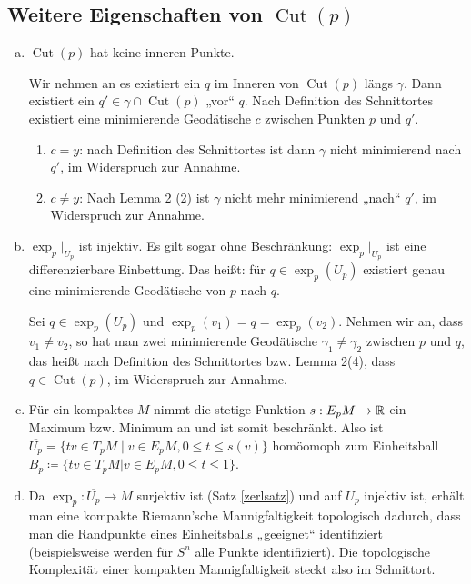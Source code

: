 \documentclass[a4paper,twoside,DIV15,BCOR12mm]{scrbook}
\renewcommand{\da}{\coloneqq}
\DeclareMathOperator{\cut}{Cut}
\begin{document}
\subsection*{Weitere Eigenschaften von $\cut(p)$}
\begin{enumerate}[(a)]
\item $\cut(p)$ hat keine inneren Punkte.
\begin{beweis}
Wir nehmen an es existiert ein $q$ im Inneren von $\cut(p)$ längs $\gamma$. Dann existiert ein $q' \in \gamma \cap \cut(p)$ „vor“ $q$. Nach Definition des Schnittortes existiert eine minimierende Geodätische $c$ zwischen Punkten $p$ und $q'$.
\begin{enumerate}[1. {Fall:}]
\item $c=y$: nach Definition des Schnittortes ist dann $\gamma$ nicht minimierend nach $q'$, im Widerspruch zur Annahme.
\item $c\ne y$: Nach Lemma 2 (2) ist $\gamma$ nicht mehr minimierend „nach“ $q'$, im Widerspruch zur Annahme.
\end{enumerate}
\end{beweis}
\item $\exp_p|_{U_p}$ ist injektiv. Es gilt sogar ohne Beschränkung: $\exp_p|_{U_p}$ ist eine differenzierbare Einbettung. Das heißt: für $q\in \exp_p(U_p)$ existiert genau eine minimierende Geodätische von $p$ nach $q$.
\begin{beweis}
Sei $q\in\exp_p(U_p)$ und $\exp_p(v_1) = q = \exp_p(v_2)$. Nehmen wir an, dass $v_1\ne v_2$, so hat man zwei minimierende Geodätische $\gamma_1\ne \gamma_2$ zwischen $p$ und $q$, das heißt nach Definition des Schnittortes bzw. Lemma 2(4), dass $q\in \cut(p)$, im Widerspruch zur Annahme.
\end{beweis}
\item Für ein kompaktes $M$ nimmt die stetige Funktion $s: E_pM \to \mathbb{R}$ ein Maximum bzw. Minimum an und ist somit beschränkt. Also ist $\overline {U_p} = \{tv \in T_pM \mid v\in E_pM, 0\le t\le s(v)\}$ homöomoph zum Einheitsball $B_p \da \{tv \in T_pM | v\in E_pM, 0\le t \le 1\}$.
\item 
Da $\exp_p: \overline{U_p} \to M$ surjektiv ist (Satz \ref{zerlsatz}) und auf $U_p$ injektiv ist, erhält man eine kompakte Riemann’sche Mannigfaltigkeit topologisch dadurch, dass man die Randpunkte eines Einheitsballs „geeignet“ identifiziert (beispielsweise werden für $S^n$ alle Punkte identifiziert). Die topologische Komplexität einer kompakten Mannigfaltigkeit steckt also im Schnittort.
\end{enumerate}
\end{document}
